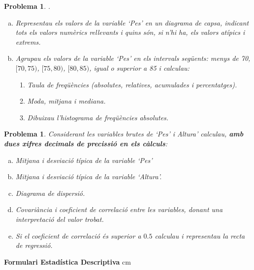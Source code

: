 \documentclass[a4paper,10pt]{article}
\newcounter{prbcont}
\newtheorem{problema}[prbcont]{Problema}
\begin{document}
\begin{problema}
.

\begin{enumerate}[a)]
\item Representau els valors de la variable `Pes' en un diagrama de capsa, indicant 
tots els valors numèrics rellevants i quins són, si n'hi ha, els valors atípics i extrems.
\item Agrupau els valors de la variable `Pes' en els intervals següents: \textit{menys de 70}, $[70, 75)$,  $[75, 80)$, 
$[80, 85)$, \textit{igual o superior a 85}
i calculau:
\begin{enumerate}[1)]
\item Taula de freqüències (absolutes, relatives, acumulades i percentatges).
\item Moda, mitjana i mediana. 
\item Dibuixau l'histograma de freqüències absolutes.
\end{enumerate}
\end{enumerate}


\end{problema}

\vspace{0.3cm}

\begin{problema}

Considerant les variables brutes de `Pes' i Altura' calculau, \textbf{amb dues xifres decimals de precissió en els càlculs}:

\begin{enumerate}[a)]
\item Mitjana i desviació típica de la variable `Pes'
\item Mitjana i desviació típica de la variable `Altura'.
\item Diagrama de dispersió.
\item Covariància i coeficient de correlació entre les variables, donant una interpretació del valor trobat.
\item Si el coeficient de correlació és superior a $0.5$ calculau i representau la recta de regressió.
\end{enumerate}

\end{problema}


\vskip 1cm

\newpage



\vskip 5cm
\textbf{Formulari Estadística Descriptiva}
 cm
\end{document}
